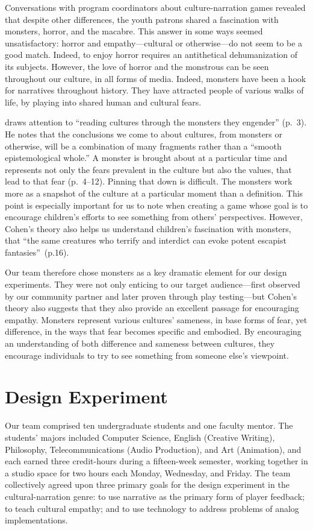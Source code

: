 \documentclass[a4paper]{article}
\begin{document}
Conversations with program coordinators about culture-narration games
revealed that despite other differences, the youth patrons shared a
fascination with monsters, horror, and the macabre.  This answer in
some ways seemed unsatisfactory: horror and empathy---cultural or
otherwise---do not seem to be a good match. Indeed,
to enjoy horror requires an antithetical dehumanization of its subjects.
However, the love of horror and the monstrous can be
seen throughout our culture, in all forms of media. Indeed, monsters have
been a hook for narratives throughout history. They have attracted
people of various walks of life, by playing into shared human and cultural
fears.

\citet{Cohen1996} draws attention to ``reading cultures through the
monsters they engender'' (p.~3).  He notes that the conclusions we
come to about cultures, from monsters or otherwise, will be a
combination of many fragments rather than a ``smooth epistemological
whole.'' A monster is brought about at a particular time and
represents not only the fears prevalent in the culture but also the
values, that lead to that fear (p.~4--12). Pinning that down is
difficult. The monsters work more as a snapshot of the culture at
a particular moment than a definition. This point is especially
important for us to note when creating a game whose goal is to
encourage children's efforts to see something from others'
perspectives.
However, Cohen's theory also helps us understand children's fascination
with monsters, that ``the same creatures who terrify and interdict can evoke potent escapist fantasies''~(p.16).

Our team therefore chose monsters as a key dramatic element for our 
design experiments. They were not only enticing to our target
audience---first observed by our community partner and later proven
through play testing---but Cohen's theory also 
suggests that they also provide an excellent passage for
encouraging empathy. Monsters represent
various cultures' sameness, in base forms of fear, yet difference, in
the ways that fear becomes specific and embodied. By encouraging an
understanding of both difference and sameness between cultures, they
encourage individuals to try to see something from someone else's
viewpoint.


\section{Design Experiment}

Our team comprised ten undergraduate students and one faculty mentor.
The students' majors included Computer Science, English
(Creative Writing), Philosophy, Telecommunications (Audio Production),
and Art (Animation), and 
each earned three credit-hours during a fifteen-week
semester,
working together in a studio space for two hours each Monday, Wednesday,
and Friday.
The team collectively agreed upon three primary goals for the design
experiment in the cultural-narration genre:
to use narrative as the primary form of player feedback;
to teach cultural empathy;
and to use technology to address problems of analog implementations.
\end{document}
